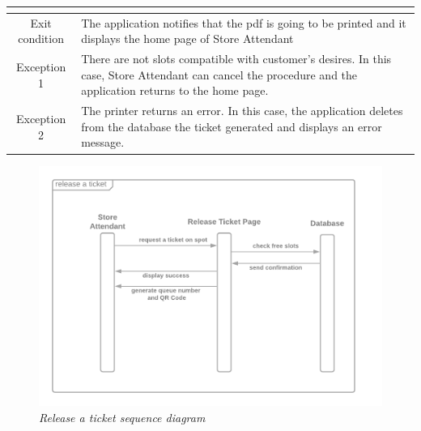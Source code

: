 \documentclass[table, 12pt]{article}
\begin{document}
\begin{longtable}{|c| p{10cm}|}
\begin{itemize}[nosep,after=\strut]
    \end{itemize}                                                                                                                                   \\
    \hline
    Exit condition   & The application notifies that the pdf is going to be printed and it displays the home page of Store Attendant
    \\
    \hline
    \hline
    Exception 1      & There are not slots compatible with customer's desires. In this case, Store Attendant can cancel the procedure and the application returns to the home page. \\
    \hline
    Exception 2      & The printer returns an error. In this case, the application deletes from the database the ticket generated and displays an error message.                    \\
    \hline
\end{longtable}

\begin{figure}[H]
    \centering
    \includegraphics[scale=0.38]{assets/release-ticket.png}
    \caption{\textit{Release a ticket sequence diagram}}
\end{figure}
\end{document}
